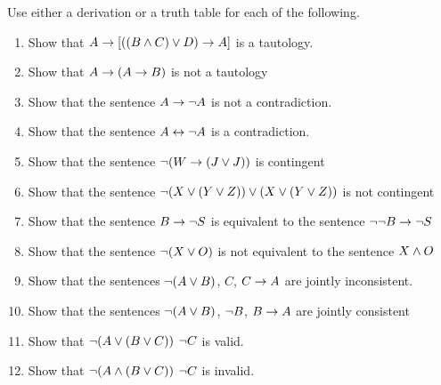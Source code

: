 \begin{practiceproblems}
\noindent\problempart Use either a derivation or a truth table for each of the following.
\begin{enumerate}%
\item Show that $A \rightarrow [((B \mathbin{\wedge} C) \vee D) \rightarrow A]$ is a tautology.
\item Show that $A \rightarrow (A \rightarrow B)$ is not a tautology
\item Show that the sentence $A \rightarrow \neg{A}$ is not a contradiction.
\item Show that the sentence $A \leftrightarrow \neg A$ is a contradiction.
\item Show that the sentence $ \neg (W \rightarrow (J \vee J)) $ is contingent
\item Show that the sentence $ \neg(X \vee (Y \vee Z)) \vee (X \vee (Y \vee Z))$ is not contingent
 \item Show that the sentence $B \rightarrow \neg S$ is equivalent to the sentence $\neg \neg B \rightarrow \neg S$
\item Show that the sentence $ \neg (X \vee O) $ is not equivalent to the sentence $X \mathbin{\wedge} O$
\item Show that the sentences $\neg(A \vee B)$, $C$, $C \rightarrow A$  are jointly inconsistent.
\item Show that the sentences $\neg(A \vee B)$, $\neg{B}$, $B \rightarrow A$ are jointly consistent
\item Show that $\neg(A \vee (B \vee C)) $ \therefore $ \neg{C}$ is valid.
\item Show that $\neg(A \mathbin{\wedge} (B \vee C))$ \therefore $ \neg{C}$ is invalid.
\end{enumerate}



\end{practiceproblems}
